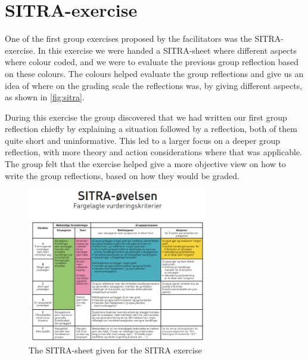 \chapter{SITRA-exercise}
One of the first group exercises proposed by the facilitators was the SITRA-exercise. In this exercise we were handed a SITRA-sheet where different aspects where colour coded, and we were to evaluate the previous group reflection based on these colours. The colours helped evaluate the group reflections and give us an idea of where on the grading scale the reflections was, by giving different aspects, as shown in \autoref{fig:sitra}. 

During this exercise the group discovered that we had written our first group reflection chiefly by explaining a situation followed by a reflection, both of them quite short and uninformative. This led to a larger focus on a deeper group reflection, with more theory and action considerations where that was applicable. The group felt that the exercise helped give a more objective view on how to write the group reflections, based on how they would be graded.
\newpage{}
\begin{figure}
	\begin{center}
		\includegraphics[width=0.7\textwidth]{Figures/sitra.png}
	\end{center}
	\caption[The SITRA Exercise]{The SITRA-sheet given for the SITRA exercise}
	\label{fig:sitra}
\end{figure}